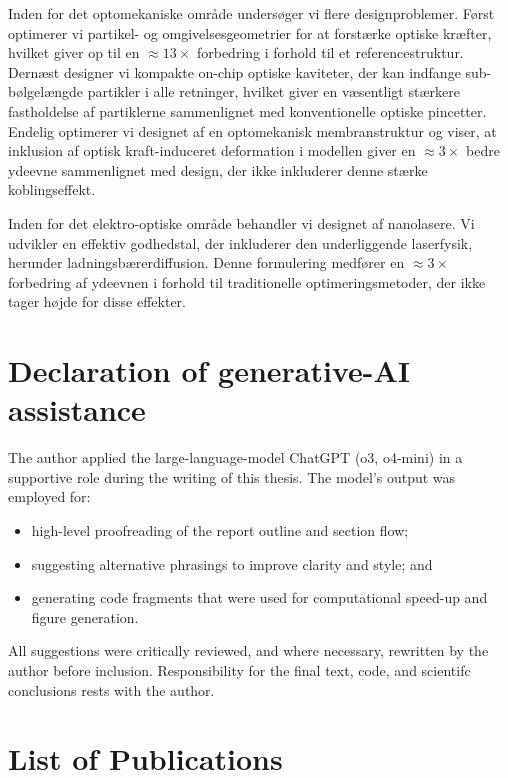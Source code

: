 Inden for det optomekaniske område undersøger vi flere designproblemer. Først optimerer vi partikel- og omgivelsesgeometrier for at forstærke optiske kræfter, hvilket giver op til en $\approx 13 \times$ forbedring i forhold til et referencestruktur. Dernæst designer vi kompakte on-chip optiske kaviteter, der kan indfange sub-bølgelængde partikler i alle retninger, hvilket giver en væsentligt stærkere fastholdelse af partiklerne sammenlignet med konventionelle optiske pincetter. Endelig optimerer vi designet af en optomekanisk membran\-struktur og viser, at inklusion af optisk kraft-induceret deformation i modellen giver en $\approx 3 \times$ bedre ydeevne sammenlignet med design, der ikke inkluderer denne stærke koblingseffekt.

Inden for det elektro-optiske område behandler vi designet af nanolasere. Vi udvikler en effektiv godhedstal, der inkluderer den underliggende laser\-fy\-sik, herunder ladningsbærerdiffusion. Denne formulering medfører en \mbox{$\approx 3 \times$} forbe\-dring af ydeevnen i forhold til traditionelle optimeringsmetoder, der ikke tager højde for disse effekter.

\cleardoublepage
\chapter*{Declaration of generative-AI assistance}

The author applied the large-language-model ChatGPT (o3, o4-mini) in a supportive role
during the writing of this thesis. The model's output was employed for:
\begin{itemize}
\item high-level proofreading of the report outline and section flow;
\item suggesting alternative phrasings to improve clarity and style; and
\item generating code fragments that were used for computational speed-up and figure generation.
\end{itemize}
All suggestions were critically reviewed, and where necessary, rewritten by the author before
inclusion. Responsibility for the final text, code, and scientifc conclusions rests with the author.

\cleardoublepage
\chapter*{List of Publications}
\nocite{ownpub0,ownpub1,ownpub3, ownpub2, ownpub4, ownpub5}
\newrefcontext[sorting=none,labelprefix=P]
\printbibliography[env=bibliographyNUM,keyword=myPub,title={List of publications},heading=none,resetnumbers]
\newrefcontext[sorting=none,labelprefix=M]
\printbibliography[env=bibliographyNUM,keyword=myMan,heading=none]

\cleardoublepage

{
  \hypersetup{linkcolor=black}
  \tableofcontents*
}


